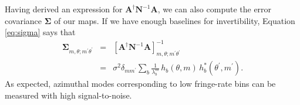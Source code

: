 \documentclass[twocolumn,apj,numberedappendix]{emulateapj}
\newcommand{\vis}{\mathbf{v}}
\newcommand{\x}{\mathbf{x}}
\newcommand{\A}{\mathbf{A}}
\newcommand{\N}{\mathbf{N}}
\begin{document}
Having derived an expression for $\A^\dagger \N^{-1} \A$, we can also compute
the error covariance $\boldsymbol \Sigma$ of our maps.  If we have enough
baselines for invertibility, Equation \eqref{eq:sigma} says that
\begin{eqnarray}
\boldsymbol \Sigma_{m, \theta ; m^\prime \theta^\prime} &=& \left[ \A^\dagger \N^{-1} \A \right]^{-1}_{m, \theta ; m^\prime \theta^\prime} \nonumber \\
&=&  \sigma^2 \delta_{m m^\prime} \sum_b \frac{1}{\lambda_b^m} \, h_b(\theta, m) \, h_{b}^*(\theta^\prime, m^\prime).
\end{eqnarray} 
As expected, azimuthal modes corresponding to low fringe-rate bins can be
measured with high signal-to-noise.
%
%
\end{document}
